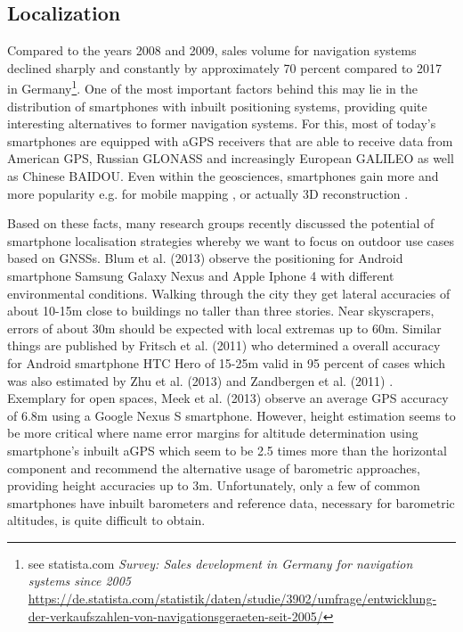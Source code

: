 \documentclass[review]{elsarticle}
\begin{document}
\subsection{Localization}
\label{sec:technology:sensors:localization}

Compared to the years 2008 and 2009, sales volume for navigation systems declined sharply and constantly by approximately 70 percent compared to 2017 in Germany\footnote{see statista.com \textit{Survey: Sales development in Germany for navigation systems since 2005} \url{https://de.statista.com/statistik/daten/studie/3902/umfrage/entwicklung-der-verkaufszahlen-von-navigationsgeraeten-seit-2005/}}. One of the most important factors behind this may lie in the distribution of smartphones with inbuilt positioning systems, providing quite interesting alternatives to former navigation systems.
For this, most of today's smartphones are equipped with \gls{aGPS} receivers that are able to receive data from American GPS, Russian GLONASS and increasingly European GALILEO as well as Chinese BAIDOU. Even within the geosciences, smartphones gain more and more popularity e.g. for mobile mapping \cite{Westhead2011,Masiero2016}, or actually 3D reconstruction \cite{Micheletti2015,Muratov2016,Ishihara2017}. 

Based on these facts, many research groups recently discussed the potential of smartphone localisation strategies whereby we want to focus on outdoor use cases based on \glspl{GNSS}. Blum et al. (2013) \cite{Blum2013} observe the positioning for Android smartphone Samsung Galaxy Nexus and Apple Iphone 4 with different environmental conditions. Walking through the city they get lateral accuracies of about 10-15m close to buildings no taller than three stories. Near skyscrapers, errors of about 30m should be expected with local extremas up to 60m. Similar things are published by Fritsch et al. (2011) \cite{Fritsch2011} who determined a overall accuracy for Android smartphone HTC Hero of 15-25m valid in 95 percent of cases which was also estimated by Zhu et al. (2013) \cite{Zhu2013} and Zandbergen et al. (2011) \cite{Zandbergen2011}. Exemplary for open spaces, Meek et al. (2013) \cite{Meek2013} observe an average \gls{GPS} accuracy of 6.8m using a Google Nexus S smartphone. However, height estimation seems to be more critical where \cite{Liu2014} name error margins for altitude determination using smartphone's inbuilt \gls{aGPS} which seem to be 2.5 times more than the horizontal component and recommend the alternative usage of barometric approaches, providing height accuracies up to 3m. Unfortunately, only a few of common smartphones have inbuilt barometers and reference data, necessary for barometric altitudes, is quite difficult to obtain.  
\end{document}
